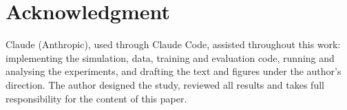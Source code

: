 \documentclass[conference]{IEEEtran}
\begin{document}
\section*{Acknowledgment}
Claude (Anthropic), used through Claude Code, assisted throughout this work: implementing the simulation, data,
training and evaluation code, running and analysing the experiments, and drafting the text and figures under the
author's direction. The author designed the study, reviewed all results and takes full responsibility for the
content of this paper.



\end{document}
